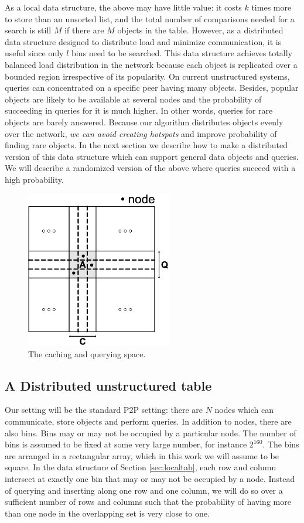 \documentclass[9.5pt,journal,final,finalsubmission,twocolumn]{IEEEtran}
\begin{document}
As a local data structure, the above may have little value: it costs $k$ times
more to store than an unsorted list, and the total number of comparisons
needed for a search is still $M$ if there are $M$ objects in the table.
However, as a distributed data structure designed to distribute load and
minimize communication, it is useful since only $l$ bins need to be searched.
This data structure achieves totally balanced load distribution 
in the network because each object is replicated over a bounded region 
irrespective of its popularity. On current unstructured systems, queries 
can concentrated on a specific peer having many objects. Besides, popular objects 
are likely to be available at several nodes and the probability of succeeding in
queries for it is much higher. In other words, queries for rare
objects are barely 
answered. Because our algorithm distributes objects 
evenly over the network, \emph{we can avoid creating hotspots} and improve 
probability of finding rare objects.
In the next section we describe how to
make a distributed version of this data structure which can support general
data objects and queries.  We will describe a randomized version of the above
where queries succeed with a high probability.
\begin{figure}
\centering
\includegraphics[width=2.5in]{space}
\caption{The caching and querying space.} \label{fig:space}
\end{figure}

\subsection{A Distributed unstructured table}
\label{sec:table}
Our setting will be the standard P2P setting: there are $N$ nodes which can
communicate, store objects and perform queries.  In addition to nodes, there
are also bins.  Bins may or may not be occupied by a particular node.  The
number of bins is assumed to be fixed at some very large number, for instance
$2^{160}$.  The bins are arranged in a rectangular array, which in this work
we will assume to be square.  In the data structure of
Section \ref{sec:localtab}, each row and column intersect at exactly one
bin that may or may not be occupied by a node.  Instead of
querying and inserting along one row and one column, we will do so over a
sufficient number of rows and columns such that the probability of having 
more than one node in the overlapping set is very close to one.
\end{document}
